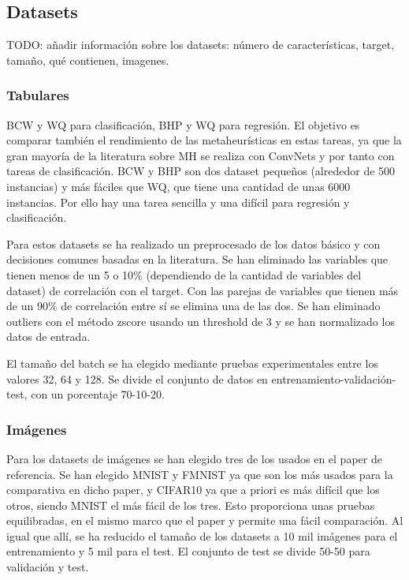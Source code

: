 \subsection{Datasets}

TODO: añadir información sobre los datasets: número de características, target, tamaño, qué contienen, imagenes.

\subsubsection{Tabulares}

BCW y WQ para clasificación, BHP y WQ para regresión. El objetivo es comparar también el rendimiento de las metaheurísticas en estas tareas, ya que la gran mayoría de la literatura sobre MH se realiza con ConvNets y por tanto con tareas de clasificación. BCW y BHP son dos dataset pequeños (alrededor de 500 instancias) y más fáciles que WQ, que tiene una cantidad de unas 6000 instancias. Por ello hay una tarea sencilla y una difícil para regresión y clasificación.

Para estos datasets se ha realizado un preprocesado de los datos básico y con decisiones comunes basadas en la literatura. Se han eliminado las variables que tienen menos de un 5 o 10\% (dependiendo de la cantidad de variables del dataset) de correlación con el target. Con las parejas de variables que tienen más de un 90\% de correlación entre sí se elimina una de las dos. Se han eliminado outliers con el método zscore usando un threshold de 3 y se han normalizado los datos de entrada.

El tamaño del batch se ha elegido mediante pruebas experimentales entre los valores 32, 64 y 128. Se divide el conjunto de datos en entrenamiento-validación-test, con un porcentaje 70-10-20.



\subsubsection{Imágenes}

Para los datasets de imágenes se han elegido tres de los usados en el paper de referencia. Se han elegido MNIST y FMNIST ya que son los más usados para la comparativa en dicho paper, y CIFAR10 ya que a priori es más difícil que los otros, siendo MNIST el más fácil de los tres. Esto proporciona unas pruebas equilibradas, en el mismo marco que el paper y permite una fácil comparación. Al igual que allí, se ha reducido el tamaño de los datasets a 10 mil imágenes para el entrenamiento y 5 mil para el test. El conjunto de test se divide 50-50 para validación y test. 

